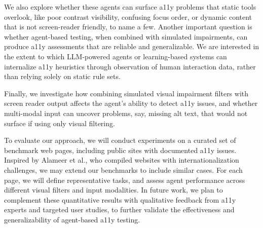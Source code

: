 We also explore whether these agents can surface \ac{a11y} problems that static tools overlook, like poor contrast visibility, confusing focus order, or dynamic content that is not screen-reader friendly, to name a few. Another important question is whether agent-based testing, when combined with simulated impairments, can produce \ac{a11y} assessments that are reliable and generalizable. We are interested in the extent to which LLM-powered agents or learning-based systems can internalize \ac{a11y} heuristics through observation of human interaction data, rather than relying solely on static rule sets.

Finally, we investigate how combining simulated visual impairment filters with screen reader output affects the agent's ability to detect \ac{a11y} issues, and whether multi-modal input can uncover problems, say, missing alt text, that would not surface if using only visual filtering.

To evaluate our approach, we will conduct experiments on a curated set of benchmark web pages, including public sites with documented \ac{a11y} issues. Inspired by Alameer et al.\cite{alameer2016detecting}, who compiled websites with internationalization challenges, we may extend our benchmarks to include similar cases. For each page, we will define representative tasks, and assess agent performance across different visual filters and input modalities. In future work, we plan to complement these quantitative results with qualitative feedback from \ac{a11y} experts and targeted user studies, to further validate the effectiveness and generalizability of agent-based \ac{a11y} testing.
